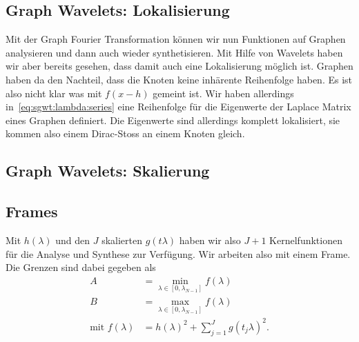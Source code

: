 \subsection{Graph Wavelets: Lokalisierung\label{subsec:sgwt:gwt:localizing}}

Mit der Graph Fourier Transformation k\"onnen wir nun Funktionen auf Graphen 
analysieren und dann auch wieder synthetisieren. Mit Hilfe von Wavelets haben 
wir aber bereits gesehen, dass damit auch eine Lokalisierung m\"oglich ist. 
Graphen haben da den Nachteil, dass die Knoten keine inh\"arente Reihenfolge 
haben. Es ist also nicht klar was mit $f(x - h)$ gemeint ist. Wir haben 
allerdings in~\cref{eq:sgwt:lambda:series} eine Reihenfolge f\"ur die 
Eigenwerte der Laplace Matrix eines Graphen definiert. Die Eigenwerte sind 
allerdings komplett lokalisiert, sie kommen also einem Dirac-Stoss an 
einem Knoten gleich.

\subsection{Graph Wavelets: Skalierung\label{subsec:sgwt:gwt:scaling}}

\subsection{Frames}

Mit $h(\lambda)$ und den $J$ skalierten $g(t\lambda)$ haben wir also $J + 1$ 
Kernelfunktionen f\"ur die Analyse und Synthese zur Verf\"ugung. Wir arbeiten 
also mit einem Frame. Die Grenzen sind dabei gegeben als
\begin{align*}
A &= \min_{\lambda \in \left[0, \lambda_{N-1}\right]} f(\lambda) \\
B &= \max_{\lambda \in \left[0, \lambda_{N-1}\right]} f(\lambda) \\
\text{mit } f(\lambda) &= h(\lambda)^2 + \sum_{j = 1}^{J} g(t_j\lambda)^2.
\end{align*}


